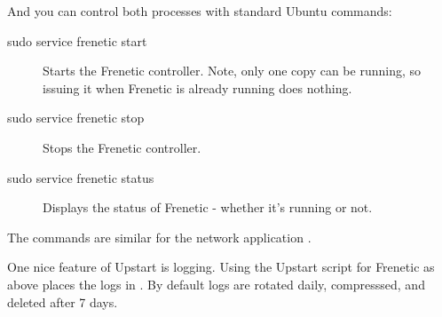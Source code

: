 \inputminted{bash}{code/productionalizing/l2_learning_switch.conf} 

And you can control both processes with standard Ubuntu commands:

\begin{description}
\item[sudo service frenetic start] Starts the Frenetic controller.  Note, only one copy can be running, so
issuing it when Frenetic is already running does nothing.   
\item[sudo service frenetic stop] Stops the Frenetic controller.
\item[sudo service frenetic status] Displays the status of Frenetic - whether it's running or not.
\end{description}

The commands are similar for the network application .  

One nice feature of Upstart is logging.  Using the Upstart script for Frenetic as above places the logs 
in .  By default logs are rotated daily, compresssed, and 
deleted after 7 days.  

